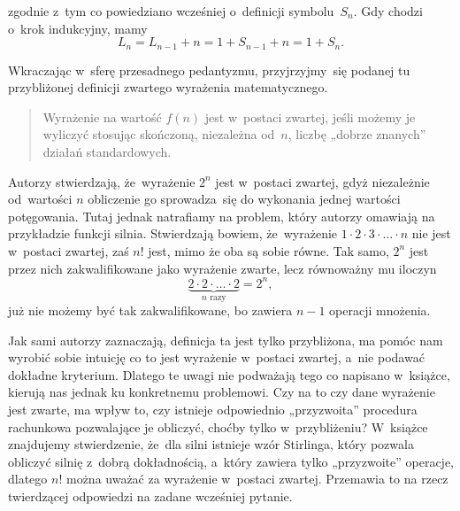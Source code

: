 \documentclass[a4paper,11pt]{article}
\numberwithin{equation}{section}
\begin{document}
\noindent
zgodnie z~tym co powiedziano wcześniej o~definicji symbolu~$S_{ n }$. Gdy
chodzi o~krok indukcyjny, mamy
\begin{equation}
  \label{eq:1115}
  L_{ n } = L_{ n - 1 } + n = 1 + S_{ n - 1 } + n = 1 + S_{ n }.
\end{equation}

\VerSpaceFour





\noindent
Wkraczając w~sferę przesadnego pedantyzmu, przyjrzyjmy~się podanej tu
przybliżonej definicji zwartego wyrażenia matematycznego.




\begin{quote}

  Wyrażenie na wartość $f( n )$ jest w~postaci zwartej, jeśli możemy je
  wyliczyć stosując skończoną, niezależna od~$n$, liczbę „dobrze znanych”
  działań standardowych.

\end{quote}





Autorzy stwierdzają, że~wyrażenie $2^{ n }$ jest w~postaci zwartej, gdyż
niezależnie od~wartości $n$ obliczenie go sprowadza~się do wykonania jednej
wartości potęgowania. Tutaj jednak natrafiamy na problem, który autorzy
omawiają na przykładzie funkcji silnia. Stwierdzają bowiem, że~wyrażenie
$1 \cdot 2 \cdot 3 \cdot \ldots \cdot n$ nie jest w~postaci zwartej, zaś $n!$ jest, mimo że
oba są sobie równe. Tak samo, $2^{ n }$ jest przez nich zakwalifikowane jako wyrażenie zwarte, lecz równoważny mu iloczyn
\begin{equation}
  \label{eq:aa}
  \underbrace{2 \cdot 2 \cdot \ldots \cdot 2}_{ n \text{ razy} } = 2^{ n },
\end{equation}
już nie możemy być tak zakwalifikowane, bo zawiera $n - 1$ operacji mnożenia.

Jak sami autorzy zaznaczają, definicja ta jest tylko przybliżona, ma pomóc
nam wyrobić sobie intuicję co to jest wyrażenie w~postaci zwartej, a~nie
podawać dokładne kryterium. Dlatego te uwagi nie podważają tego co napisano
w~książce, kierują nas jednak ku konkretnemu problemowi. Czy na to czy dane
wyrażenie jest zwarte, ma wpływ to, czy istnieje odpowiednio „przyzwoita”
procedura rachunkowa pozwalające je obliczyć, choćby tylko w~przybliżeniu?
W~książce znajdujemy stwierdzenie, że~dla silni istnieje wzór Stirlinga,
który pozwala obliczyć silnię z~dobrą dokładnością, a~który zawiera tylko
„przyzwoite” operacje, dlatego $n!$ można uważać za wyrażenie w~postaci
zwartej. Przemawia to na rzecz twierdzącej odpowiedzi na zadane wcześniej
pytanie.
\end{document}
